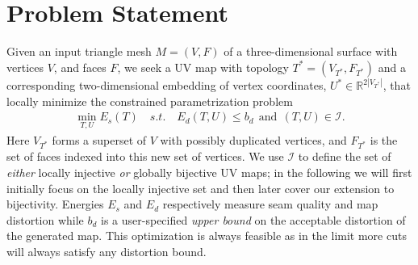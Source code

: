 
\section{Problem Statement}

Given an input triangle mesh $M=(V,F)$ of a three-dimensional surface with vertices $V$, and faces $F$, we seek a UV map with topology $T^*=(V_{T^*}, F_{T^*})$ and a corresponding two-dimensional embedding of vertex coordinates, $U^* \in \mathbb{R}^{2 |V_{T^*}|}$, that locally minimize the constrained parametrization problem
%
\begin{align}
	\min_{T,U} E_s(T) \quad s.t. \quad E_d(T,U) \leq b_d\ \ \text{and}\ \ (T, U) \in \mathcal{I}.
	\label{eq:p1}
\end{align}
%
Here $V_{T^*}$ forms a superset of $V$ with possibly duplicated vertices, and $F_{T^*}$ is the set of faces indexed into this new set of vertices. We use $\mathcal{I}$ to define the set of \emph{either} locally injective \emph{or} globally bijective UV maps; in the following we will first initially focus on the locally injective set and then later cover our extension to bijectivity. Energies $E_s$ and $E_d$ respectively measure seam quality and map distortion while $b_d$ is a user-specified \emph{upper bound} on the acceptable distortion of the generated map. This optimization is always feasible as in the limit more cuts will always satisfy any distortion bound. %

